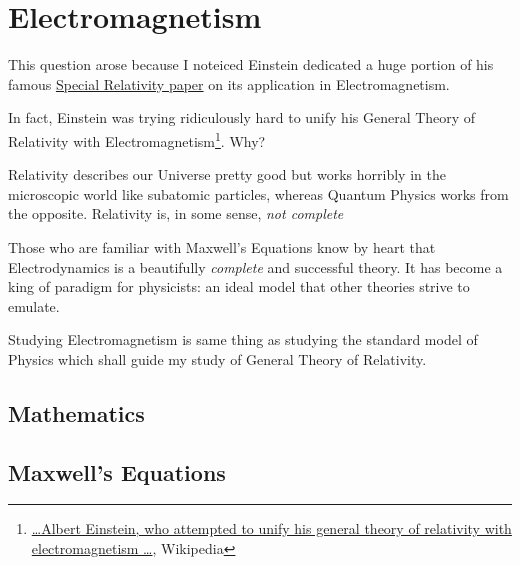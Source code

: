 
    

    \part{Electromagnetism}

    \begin{tcolorbox}[
        parbox=false,
        enhanced,
        colback=green!5!white,
        colframe=green!75!black,
        colbacktitle=green!85!black,
        title={Why study Electromagnetism?},
        watermark graphics=砂糖-3.png,
        watermark opacity=0.3
    ]
        This question arose because I noteiced Einstein dedicated a huge portion of his famous
        \hyperlink{sr-original-paper}{Special Relativity paper} on its application in Electromagnetism.

        In fact, Einstein was trying ridiculously hard to unify his General Theory of Relativity with
        Electromagnetism\footnote{\href{https://en.wikipedia.org/wiki/Unified_field_theory}{\ldots Albert Einstein, who attempted to unify his general theory of relativity with electromagnetism \ldots}, Wikipedia}. Why?

        Relativity describes our Universe pretty good but works horribly in the microscopic world like subatomic
        particles, whereas Quantum Physics works from the opposite. Relativity is, in some sense, \textit{not complete}

        Those who are familiar with Maxwell's Equations know by heart that Electrodynamics is a beautifully
        \textit{complete} and successful theory. It has become a king of paradigm for physicists: an ideal model that
        other theories strive to emulate.

        Studying Electromagnetism is same thing as studying the standard model of Physics which shall guide my study of
        General Theory of Relativity.
    \end{tcolorbox}

    \chapter{Mathematics}
    
    \chapter{Maxwell's Equations}

